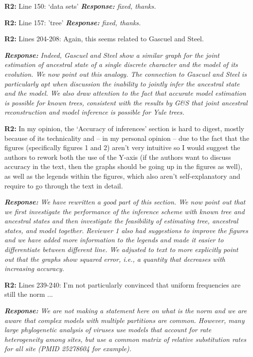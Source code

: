 \documentclass[aps,rmp,onecolumn]{revtex4-1}
\newcommand{\refb}[1]{\textbf{R2:} #1}
\newcommand{\response}[1]{{\it {\color{response}\textbf{Response:} #1}}}
\begin{document}
\refb{Line 150: `data sets'}
\response{fixed, thanks.}

\refb{Line 157: 'tree'}
\response{fixed, thanks.}

\refb{Lines 204-208: Again, this seems related to Gascuel and Steel.}

\response{Indeed, Gascuel and Steel show a similar graph for the joint estimation of ancestral state of a single discrete character and the model of its evolution. We now point out this analogy.
The connection to Gascuel and Steel is particularly apt when discussion the inability to jointly infer the ancestral state and the model.
We also draw attention to the fact that accurate model estimation is possible for known trees, consistent with the results by G\&S that joint ancestral reconstruction and model inference is possible for Yule trees.
}

\refb{In my opinion, the ‘Accuracy of inferences’ section is hard to digest, mostly because of its technicality and -- in my personal opinion -- due to the fact that the figures (specifically figures 1 and 2) aren’t very intuitive so I would suggest the authors to rework both the use of the Y-axis (if the authors want to discuss accuracy in the text, then the graphs should be going up in the figures as well), as well as the legends within the figures, which also aren’t self-explanatory and require to go through the text in detail.}

\response{We have rewritten a good part of this section. We now point out that we first investigate the performance of the inference scheme with known tree and ancestral states and then investigate the feasibility of estimating tree, ancestral states, and model together.
Reviewer 1 also had suggestions to improve the figures and we have added more information to the legends and made it easier to differentiate between different line.
We adjusted to text to more explicitly point out that the graphs show squared error, i.e., a quantity that decreases with increasing accuracy.
}

\refb{Lines 239-240: I’m not particularly convinced that uniform frequencies are still the norm ...}

\response{We are not making a statement here on what is the norm and we are aware that complex models with multiple partitions are common. However, many large phylogenetic analysis of viruses use models that account for rate heterogeneity among sites, but use a common matrix of relative substitution rates for all site (PMID 25278604 for example). }
\end{document}

